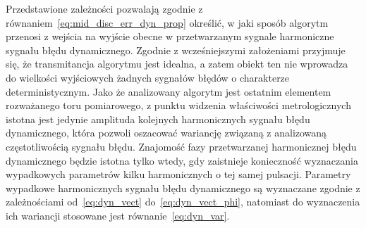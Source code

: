 Przedstawione zależności pozwalają zgodnie z równaniem~\eqref{eq:mid_disc_err_dyn_prop} określić, w jaki sposób algorytm przenosi z wejścia na wyjście obecne w przetwarzanym sygnale harmoniczne sygnału błędu dynamicznego. Zgodnie z wcześniejszymi założeniami przyjmuje się, że transmitancja algorytmu jest idealna, a zatem obiekt ten nie wprowadza do wielkości wyjściowych żadnych sygnałów błędów o charakterze deterministycznym. Jako że analizowany algorytm jest ostatnim elementem rozważanego toru pomiarowego, z punktu widzenia właściwości metrologicznych istotna jest jedynie amplituda kolejnych harmonicznych sygnału błędu dynamicznego, która pozwoli oszacować wariancję związaną z analizowaną częstotliwością sygnału błędu. Znajomość fazy przetwarzanej harmonicznej błędu dynamicznego będzie istotna tylko wtedy, gdy zaistnieje konieczność wyznaczania wypadkowych parametrów kilku harmonicznych o tej samej pulsacji. Parametry wypadkowe harmonicznych sygnału błędu dynamicznego są wyznaczane zgodnie z zależnościami od~\eqref{eq:dyn_vect} do~\eqref{eq:dyn_vect_phi}, natomiast do wyznaczenia ich wariancji stosowane jest równanie~\eqref{eq:dyn_var}.

